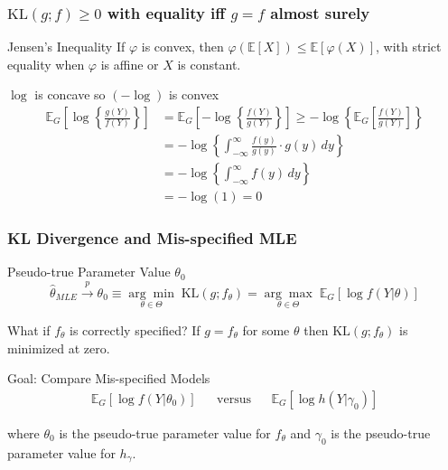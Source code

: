 \begin{frame}
  \frametitle{$\text{KL}(g;f) \geq0$ with equality iff $g = f$ almost surely}

  \begin{block}{Jensen's Inequality}
    If $\varphi$ is convex, then $\varphi(\mathbb{E}[X]) \leq \mathbb{E}[\varphi(X)]$, with strict equality when $\varphi$ is affine or $X$ is constant.
  \end{block}

  \begin{block}{$\log$ is concave so $(-\log)$ is convex}
  \begin{align*}
    \mathbb{E}_G\left[ \log\left\{ \frac{g(Y)}{f(Y)} \right\} \right] &= \mathbb{E}_G\left[ -\log\left\{ \frac{f(Y)}{g(Y)} \right\} \right] \geq -\log \left\{ \mathbb{E}_G\left[ \frac{f(Y)}{g(Y)} \right] \right\}\\
    &= -\log \left\{ \int_{-\infty}^{\infty} \frac{f(y)}{g(y)} \cdot g(y)\, dy \right\}\\
    &=-\log \left\{ \int_{-\infty}^{\infty} f(y)\, dy \right\}\\
    &= -\log(1) = 0
  \end{align*}
\end{block}

\end{frame}
\begin{frame}
  \frametitle{KL Divergence and Mis-specified MLE}

  \begin{block}{Pseudo-true Parameter Value $\theta_0$}
    \vspace{-1em}
  \[
    \widehat{\theta}_{MLE} \overset{p}{\rightarrow} \theta_0 \equiv \underset{\theta \in \Theta}{\arg \min} \; \text{KL}(g;f_\theta) = \underset{\theta \in \Theta}{\arg \max} \; \mathbb{E}_G[\log f(Y|\theta)] 
  \]
\end{block}


\pause

\begin{block}{What if $f_\theta$ is correctly specified?}
  If $g = f_\theta$ for some $\theta$ then $\text{KL}(g;f_\theta)$ is minimized at zero.
\end{block}

\pause

\begin{alertblock}{Goal: Compare Mis-specified Models}
  \vspace{-2.5em}
  \begin{align*}
    \mathbb{E}_G \left[ \log f(Y|\theta_0) \right] && \mbox{versus} && 
    \mathbb{E}_G \left[ \log h(Y|\gamma_0) \right]
  \end{align*}
  \vspace{-2em}

 where $\theta_0$ is the pseudo-true parameter value for $f_\theta$ and $\gamma_0$ is the pseudo-true parameter value for $h_\gamma$.
  
\end{alertblock}

\end{frame}
